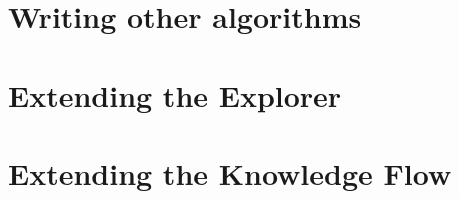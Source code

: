 
\newpage
\section{Writing other algorithms}



\newpage
\section{Extending the Explorer}


\newpage
\section{Extending the Knowledge Flow}

